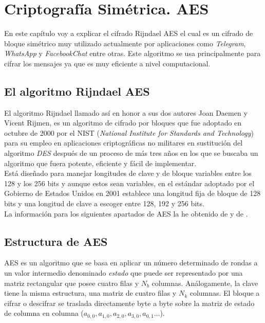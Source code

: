 \chapter{Criptografía Simétrica. AES}
En este capítulo voy a explicar el cifrado Rijndael AES el cual es un cifrado de bloque simétrico muy utilizado actualmente por aplicaciones como \emph{Telegram}, \emph{WhatsApp} y \emph{FacebookChat} entre otras. Este algoritmo se usa principalmente para cifrar los mensajes ya que es muy eficiente a nivel computacional.\\
\section{El algoritmo Rijndael AES}
El algoritmo Rijndael llamado así en honor a sus dos autores Joan Daemen y Vicent Rijmen, es un algoritmo de cifrado por bloques que fue adoptado en octubre de 2000 por el NIST (\emph{National Institute for Standards and Technology}) para su empleo en aplicaciones criptográficas no militares en sustitución del algoritmo \emph{DES} después de un proceso de más tres años en los que se buscaba un algoritmo que fuera potente, eficiente y fácil de implementar.\\
Está diseñado para manejar longitudes de clave y de bloque variables entre los 128 y los 256 bits y aunque estos sean variables, en el estándar adoptado por el Gobierno de Estados Unidos en 2001 \cite{aesUsa} establece una longitud fija de bloque de 128 bits y una longitud de clave a escoger entre 128, 192 y 256 bits.\\
La información para los siguientes apartados de AES la he obtenido de \cite{En2011} y de \cite{criptografia}.
\newpage
\section{Estructura de AES}
AES es un algoritmo que se basa en aplicar un número determinado de rondas a un valor intermedio denominado \emph{estado} que puede ser representado por una matriz rectangular que posee cuatro filas y $N_{b}$ columnas. Análogamente, la clave tiene la misma estructura, una matriz de cuatro filas y $N_{k}$ columnas.
El bloque a cifrar o descifrar se traslada directamente byte a byte sobre la matriz de estado de columna en columna ($a_{0,0}, a_{1,0}, a_{2,0}, a_{3,0}, a_{0,1} \dots$).

